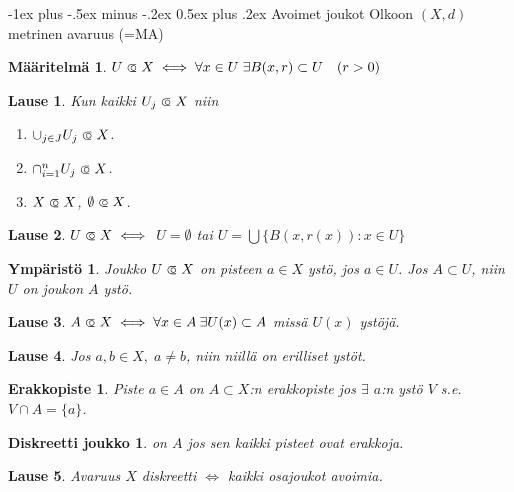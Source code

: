 \documentclass[landscape,a4paper,10pt]{article}
\makeatletter
\renewcommand{\section}{\@startsection{section}{1}{0mm}%
                                {-1ex plus -.5ex minus -.2ex}%
                                {0.5ex plus .2ex}%
                                {\color{blue}\normalfont\large\bfseries}}
\newcommand\opn{\mathrel{\ooalign{$\subset$\cr
  \hidewidth\hbox{$\circ\mkern.5mu$}\cr}}}
\theoremstyle{customtheoremstyle}
\newtheorem*{theorem}{Lause}
\newtheorem*{definition}{Määritelmä}
\makeatother
\begin{document}
\begin{multicols*}{3}
\section{Avoimet joukot}
Olkoon $(X,d)$ metrinen avaruus (=MA)
\begin{definition}
  $U \opn X \iff \forall x \in U \; \exists B(x,r) \subset U \quad (r>0)$
\end{definition}

\begin{theorem}
  Kun kaikki $U_j \opn X$ niin
  \begin{enumerate}
    \item{$\cup_{j \in J} U_j \opn X$.}
    \item{$\cap_{i=1}^{n} U_j \opn X$.}
    \item{$X \opn X$, $\emptyset \opn X$.}
  \end{enumerate}
\end{theorem}

\begin{theorem}
$U \opn X \iff$ $U = \emptyset$ tai $U = \bigcup \{B(x,r(x)) : x \in U\}$
\end{theorem}

\newtheorem*{ystö}{Ympäristö}
\begin{ystö}
  Joukko $U \opn X$ on pisteen $a \in X$ ystö, jos $a \in U$. Jos $A \subset
  U$, niin $U$ on joukon $A$ ystö.
\end{ystö}

\begin{theorem}
  $A \opn X \iff \forall x \in A \: \exists U(x) \subset A$ missä $U(x)$
  ystöjä.
\end{theorem}

\begin{theorem}
  Jos $a,b \in X, \; a \neq b$, niin niillä on erilliset ystöt.
\end{theorem}

\newtheorem*{erakkopiste}{Erakkopiste}
\begin{erakkopiste}
 Piste $a \in A$ on $A \subset X$:n erakkopiste jos $\exists$ $a$:n ystö $V$ s.e. $V \cap A = \{a\}$.
\end{erakkopiste}

\newtheorem*{diskjoukko}{Diskreetti joukko}
\begin{diskjoukko}
  on $A$ jos sen kaikki pisteet ovat erakkoja.
\end{diskjoukko}

\begin{theorem}
  Avaruus $X$ diskreetti $\iff$ kaikki osajoukot avoimia.
\end{theorem}


\end{multicols*}
\end{document}
